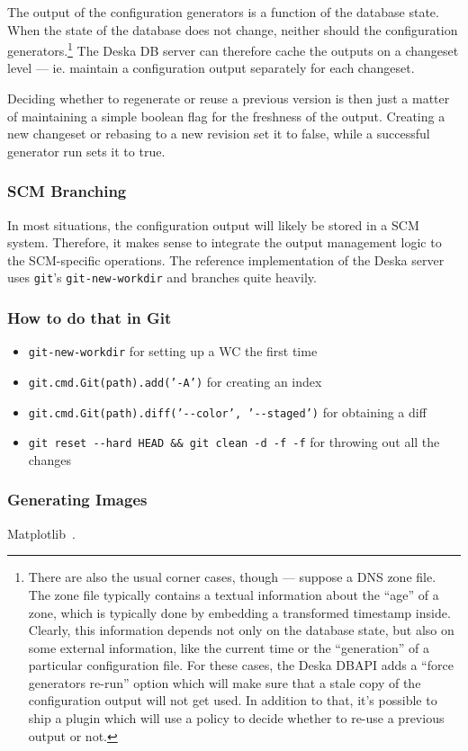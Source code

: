 \documentclass[deska]{subfiles}
\begin{document}
The output of the configuration generators is a function of the database state.  When the state of the database does not
change, neither should the configuration generators.\footnote{There are also the usual corner cases, though --- suppose a
DNS zone file.  The zone file typically contains a textual information about the ``age'' of a zone, which is typically
done by embedding a transformed timestamp inside.  Clearly, this information depends not only on the database state, but
also on some external information, like the current time or the ``generation'' of a particular configuration file.  For
these cases, the Deska DBAPI adds a ``force generators re-run'' option which will make sure that a stale copy of the
configuration output will not get used.  In addition to that, it's possible to ship a plugin which will use a policy to
decide whether to re-use a previous output or not.}  The Deska DB server can therefore cache the outputs on a changeset
level --- ie. maintain a configuration output separately for each changeset.

Deciding whether to regenerate or reuse a previous version is then just a matter of maintaining a simple boolean flag
for the freshness of the output.  Creating a new changeset or rebasing to a new revision set it to false, while a
successful generator run sets it to true.

\subsubsection{SCM Branching}

In most situations, the configuration output will likely be stored in a SCM system.  Therefore, it makes sense to
integrate the output management logic to the SCM-specific operations.  The reference implementation of the Deska server
uses {\tt git}'s {\tt git-new-workdir} and branches quite heavily.

\subsubsection{How to do that in Git}

\begin{itemize}
    \item {\tt git-new-workdir} for setting up a WC the first time
    \item {\tt git.cmd.Git(path).add('-A')} for creating an index
    \item {\tt git.cmd.Git(path).diff('-{-}color', '-{-}staged')} for obtaining a diff
    \item {\tt git reset -{-}hard HEAD \&\& git clean -d -f -f} for throwing out all the changes
\end{itemize}

\subsubsection{Generating Images}

Matplotlib~\cite{matplotlib}.
\end{document}
